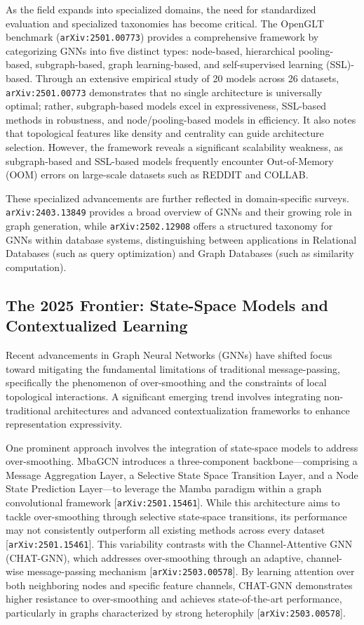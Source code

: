 \documentclass[11pt]{article}
\begin{document}
As the field expands into specialized domains, the need for standardized evaluation and specialized taxonomies has become critical. The OpenGLT benchmark (\texttt{arXiv:2501.00773}) provides a comprehensive framework by categorizing GNNs into five distinct types: node-based, hierarchical pooling-based, subgraph-based, graph learning-based, and self-supervised learning (SSL)-based. Through an extensive empirical study of 20 models across 26 datasets, \texttt{arXiv:2501.00773} demonstrates that no single architecture is universally optimal; rather, subgraph-based models excel in expressiveness, SSL-based methods in robustness, and node/pooling-based models in efficiency. It also notes that topological features like density and centrality can guide architecture selection. However, the framework reveals a significant scalability weakness, as subgraph-based and SSL-based models frequently encounter Out-of-Memory (OOM) errors on large-scale datasets such as REDDIT and COLLAB.

These specialized advancements are further reflected in domain-specific surveys. \texttt{arXiv:2403.13849} provides a broad overview of GNNs and their growing role in graph generation, while \texttt{arXiv:2502.12908} offers a structured taxonomy for GNNs within database systems, distinguishing between applications in Relational Databases (such as query optimization) and Graph Databases (such as similarity computation).

\subsection{The 2025 Frontier: State-Space Models and Contextualized Learning}

Recent advancements in Graph Neural Networks (GNNs) have shifted focus toward mitigating the fundamental limitations of traditional message-passing, specifically the phenomenon of over-smoothing and the constraints of local topological interactions. A significant emerging trend involves integrating non-traditional architectures and advanced contextualization frameworks to enhance representation expressivity.

One prominent approach involves the integration of state-space models to address over-smoothing. MbaGCN introduces a three-component backbone—comprising a Message Aggregation Layer, a Selective State Space Transition Layer, and a Node State Prediction Layer—to leverage the Mamba paradigm within a graph convolutional framework [\texttt{arXiv:2501.15461}]. While this architecture aims to tackle over-smoothing through selective state-space transitions, its performance may not consistently outperform all existing methods across every dataset [\texttt{arXiv:2501.15461}]. This variability contrasts with the Channel-Attentive GNN (CHAT-GNN), which addresses over-smoothing through an adaptive, channel-wise message-passing mechanism [\texttt{arXiv:2503.00578}]. By learning attention over both neighboring nodes and specific feature channels, CHAT-GNN demonstrates higher resistance to over-smoothing and achieves state-of-the-art performance, particularly in graphs characterized by strong heterophily [\texttt{arXiv:2503.00578}].
\end{document}

